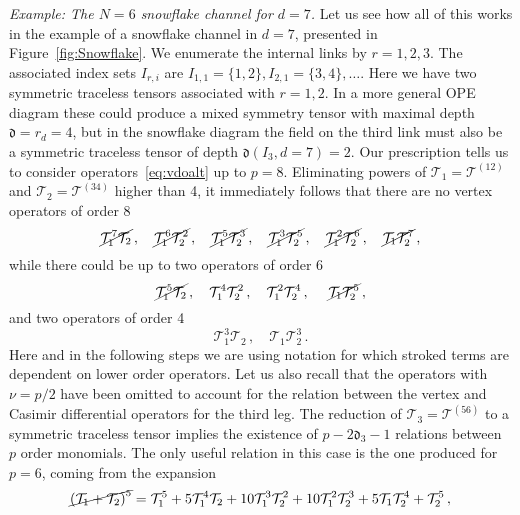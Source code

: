 \documentclass{article}
\def\dep{\mathfrak{d}}
\begin{document}
\textit{Example: The $N=6$ snowflake channel for $d=7$.} Let us see how all of this works 
in the example of a snowflake channel in $d=7$, presented in Figure~\ref{fig:Snowflake}.
We enumerate the internal links by $r=1,2,3$. The associated index sets $I_{r,i}$ are  
$I_{1,1} = \{1,2\}, I_{2,1} = \{3,4\}, \dots$. Here we have two symmetric traceless 
tensors associated with $r=1,2$. In a more general OPE diagram these could produce a mixed 
symmetry tensor with maximal depth $\dep = r_d = 4$, but in the snowflake diagram the field 
on the third link must also be a symmetric traceless tensor of depth $\dep(I_3,d=7) = 2$. 
Our prescription tells us to consider operators~\eqref{eq:vdoalt} up to $p=8$. Eliminating 
powers of $\mathcal{T}_1 = \mathcal{T}^{(12)}$ and $\mathcal{T}_2 = \mathcal{T}^{(34)}$ 
higher than 4, it immediately follows that there are no vertex operators of order 8
\begin{equation}
    \cancel{\mathcal{T}_{1}^7\mathcal{T}_{2}}\,, \quad 
    \cancel{\mathcal{T}_{1}^6\mathcal{T}_{2}^2}\,, \quad 
    \cancel{\mathcal{T}_{1}^5\mathcal{T}_{2}^3}\,, \quad 
    \cancel{\mathcal{T}_{1}^3\mathcal{T}_{2}^5}\,, \quad 
    \cancel{\mathcal{T}_{1}^2\mathcal{T}_{2}^6}\,, \quad 
    \cancel{\mathcal{T}_{1}\mathcal{T}_{2}^7}\,,
\end{equation}
while there could be up to two operators of order 6
\begin{equation}
    \cancel{\mathcal{T}_{1}^5\mathcal{T}_{2}}\,, \quad 
    \mathcal{T}_{1}^4\mathcal{T}_{2}^2\,, \quad 
    \mathcal{T}_{1}^2\mathcal{T}_{2}^4\,, \quad \
    \cancel{\mathcal{T}_{1}\mathcal{T}_{2}^5}\,,
    \label{sixthordermonomialssnowflake}
\end{equation}
and two operators of order 4
\begin{equation}
    \mathcal{T}_{1}^3\mathcal{T}_{2}\,, \quad 
    \mathcal{T}_{1}\mathcal{T}_{2}^3\,.
    \label{fourthordermonomialssnowflake}
\end{equation}
Here and in the following steps we are using notation for which stroked terms are 
dependent on lower order operators. Let us also recall that the operators with $\nu = p/2$ 
have been omitted to account for the relation between the vertex and Casimir differential 
operators for the third leg. The reduction of $\mathcal{T}_3 = \mathcal{T}^{(56)}$ to a
symmetric traceless tensor implies the existence of $p-2\dep_{3}-1$ relations between 
$p$ order monomials. The only useful relation in this case is the one produced for 
$p=6$, coming from the expansion
\begin{equation}
    \cancel{\left(\mathcal{T}_{1}+\mathcal{T}_{2} \right)^5}=
    \mathcal{T}_{1}^5+5\mathcal{T}_{1}^4\mathcal{T}_{2}+
    10\mathcal{T}_{1}^3\mathcal{T}_{2}^2+10\mathcal{T}_{1}^2\mathcal{T}_{2}^3+
    5\mathcal{T}_{1}\mathcal{T}_{2}^4+\mathcal{T}_{2}^5\,,
\end{equation}
\end{document}
